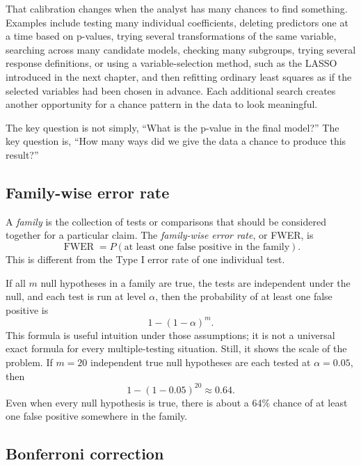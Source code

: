 That calibration changes when the analyst has many chances to find something.  Examples include testing many individual coefficients, deleting predictors one at a time based on p-values, trying several transformations of the same variable, searching across many candidate models, checking many subgroups, trying several response definitions, or using a variable-selection method, such as the LASSO introduced in the next chapter, and then refitting ordinary least squares as if the selected variables had been chosen in advance.  Each additional search creates another opportunity for a chance pattern in the data to look meaningful.

The key question is not simply, ``What is the p-value in the final model?''  The key question is, ``How many ways did we give the data a chance to produce this result?''

\subsection*{Family-wise error rate}

A \emph{family} is the collection of tests or comparisons that should be considered together for a particular claim.  The \emph{family-wise error rate}, or FWER, is
\begin{equation}
  \operatorname{FWER}
  =P(\text{at least one false positive in the family}).
\end{equation}
This is different from the Type I error rate of one individual test.

If all \(m\) null hypotheses in a family are true, the tests are independent under the null, and each test is run at level \(\alpha\), then the probability of at least one false positive is
\begin{equation}
  1-(1-\alpha)^m.
\end{equation}
This formula is useful intuition under those assumptions; it is not a universal exact formula for every multiple-testing situation.  Still, it shows the scale of the problem.  If \(m=20\) independent true null hypotheses are each tested at \(\alpha=0.05\), then
\begin{equation}
  1-(1-0.05)^{20} \approx 0.64.
\end{equation}
Even when every null hypothesis is true, there is about a 64\% chance of at least one false positive somewhere in the family.

\subsection*{Bonferroni correction}

